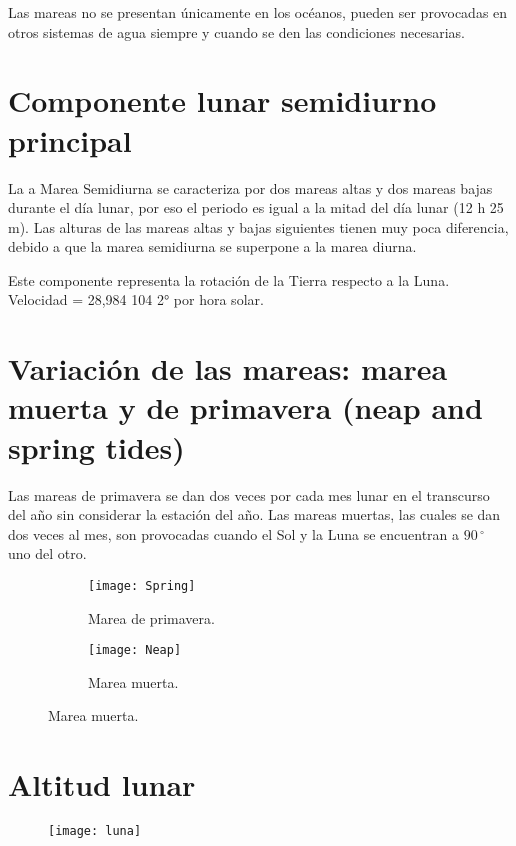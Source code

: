 \documentclass[12pt]{article}
\begin{document}
Las mareas no se presentan únicamente en los océanos, pueden ser provocadas en otros sistemas de agua siempre y cuando se den las condiciones necesarias.

\section{Componente lunar semidiurno principal}
La a Marea Semidiurna se caracteriza por dos mareas altas y dos mareas bajas durante el día lunar, por eso el periodo 
es igual a la mitad del día lunar (12 h 25 m). Las alturas de las mareas altas y bajas siguientes 
tienen muy poca diferencia, debido a que la marea semidiurna se superpone a la marea diurna.

Este componente representa la rotación de la Tierra respecto a la Luna. Velocidad = 28,984 104 2° por hora solar.

\section{Variación de las mareas: marea muerta y de primavera (neap and spring tides)}

Las mareas de primavera se dan dos veces por cada mes lunar en el transcurso del año sin considerar la estación del año. Las mareas muertas, las cuales se dan dos veces al mes, son provocadas cuando el Sol y la Luna se encuentran a $90\,^{\circ}$ uno del otro.\\

\begin{figure}[H]
  \begin{subfigure}[b]{0.5\textwidth}
\texttt{[image: Spring]}
    \caption{Marea de primavera.}
    \label{fig:f1}
  \end{subfigure}
  \hfill
  \begin{subfigure}[b]{0.6\textwidth}
    \texttt{[image: Neap]}
    \caption{Marea muerta.}
    \label{fig:f2}
  \end{subfigure}
\end{figure}

\section{Altitud lunar}
\begin{figure}[h]
\centering
\texttt{[image: luna]}
\end{figure}
\end{document}
